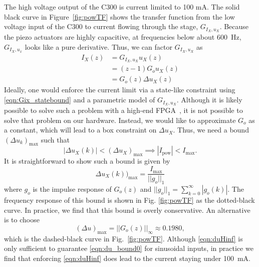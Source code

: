 \documentclass[twocolumn,twoside]{IEEEtran}
\begin{document}
The high voltage output of the C300 is current limited to 100 mA. The solid black curve in Figure~\ref{fig:powTF} shows the transfer function from the low voltage input of the C300 to current flowing through the stage, $G_{I_X,u_X}$. Because the piezo actuators are highly capacitive, at frequencies below about 600~Hz, $G_{I_X,u_x}$ looks like a pure derivative.
Thus, we can factor $G_{I_X,u_X}$ as
\begin{align}
  I_{X}(z) &= G_{I_X,u_X} u_X(z)\label{eqn:Gix_statebound}\\
          & = (z-1) G_o u_X(z)\\
          & = G_o(z) \Delta u_X(z) \label{eqn:Gostatebound}
\end{align}
Ideally, one would enforce the current limit via a state-like constraint using \eqref{eqn:Gix_statebound} and a parametric model of $G_{I_X,u_X}$.
Although it is likely possible to solve such a problem with a high-end FPGA~\cite{Jerez_Trans_2014}, it is not possible to solve that problem on our hardware. Instead, we would like to approximate $G_o$ as a constant, which will lead to a box constraint on $\Delta u_X$. Thus, we need a bound $(\Delta u_k)_{\text{max}}$ such that
\begin{equation}
  |\Delta u_X(k)| < (\Delta u_X)_{\text{max}} \implies |I_{\text{pow}}| < I_{\text{max}}.\label{eqn:du_bound0}
\end{equation}
It is straightforward to show such a bound is given by 
\begin{equation}
\Delta u_X(k))_{\text{max}} = \frac{I_{\text{max}}}{||g_o||_1}
\end{equation}
where $g_o$ is the impulse response of $G_o(z)$ and $||g_o||_1 = \sum_{k=0}^{\infty}|g_o(k)|$. The frequency response of this bound is shown in Fig. \ref{fig:powTF} as the dotted-black curve. In practice, we find that this bound is overly conservative. An alternative is to choose
\begin{equation}
(\Delta u)_{\text{max}} = ||G_o(z)||_{\infty}\approx 0.1980, \label{eqn:duHinf}
\end{equation}
which is the dashed-black curve in Fig.~\ref{fig:powTF}. Although \eqref{eqn:duHinf} is only sufficient to guarantee \eqref{eqn:du_bound0} for sinusoidal inputs, in practice we find that enforcing \eqref{eqn:duHinf} does lead to the current staying under 100~mA.

\end{document}
